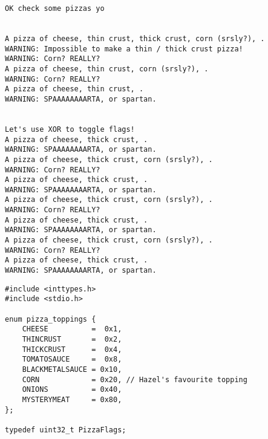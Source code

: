 \documentclass[11pt]{article}
\begin{document}
\begin{enumerate}
\begin{verbatim}
OK check some pizzas yo


A pizza of cheese, thin crust, thick crust, corn (srsly?), .
WARNING: Impossible to make a thin / thick crust pizza!
WARNING: Corn? REALLY?
A pizza of cheese, thin crust, corn (srsly?), .
WARNING: Corn? REALLY?
A pizza of cheese, thin crust, .
WARNING: SPAAAAAAAARTA, or spartan.


Let's use XOR to toggle flags!
A pizza of cheese, thick crust, .
WARNING: SPAAAAAAAARTA, or spartan.
A pizza of cheese, thick crust, corn (srsly?), .
WARNING: Corn? REALLY?
A pizza of cheese, thick crust, .
WARNING: SPAAAAAAAARTA, or spartan.
A pizza of cheese, thick crust, corn (srsly?), .
WARNING: Corn? REALLY?
A pizza of cheese, thick crust, .
WARNING: SPAAAAAAAARTA, or spartan.
A pizza of cheese, thick crust, corn (srsly?), .
WARNING: Corn? REALLY?
A pizza of cheese, thick crust, .
WARNING: SPAAAAAAAARTA, or spartan.
\end{verbatim}

\begin{verbatim}
#include <inttypes.h>
#include <stdio.h>

enum pizza_toppings {
    CHEESE          =  0x1,
    THINCRUST       =  0x2,
    THICKCRUST      =  0x4,
    TOMATOSAUCE     =  0x8,
    BLACKMETALSAUCE = 0x10, 
    CORN            = 0x20, // Hazel's favourite topping
    ONIONS          = 0x40,
    MYSTERYMEAT     = 0x80,
};

typedef uint32_t PizzaFlags;


\end{verbatim}
\end{enumerate}
\end{document}
